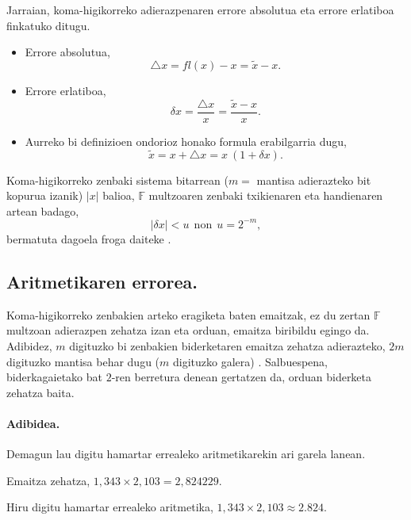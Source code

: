 Jarraian, koma-higikorreko adierazpenaren errore absolutua eta errore erlatiboa finkatuko ditugu.
\begin{itemize}
\item Errore absolutua,
\begin{equation*}
\triangle x= fl(x)-x= \tilde{x}-x. 
\end{equation*} 
\item Errore erlatiboa, 
\begin{equation*}
\delta x =\frac{\triangle x}{x} = \frac{\tilde{x}-x}{x}. 
\end{equation*}
\item Aurreko bi definizioen ondorioz honako formula erabilgarria dugu,
\begin{equation*}
\tilde{x}= x+\triangle x = x \ (1+\delta x).
\end{equation*}
\end{itemize}

Koma-higikorreko zenbaki sistema bitarrean ($m=$ mantisa adierazteko bit kopurua izanik) $|x|$ balioa, $\mathbb{F}$ multzoaren zenbaki txikienaren eta handienaren artean badago,
\begin{equation*}
 |\delta x|< u \ \ \text{non} \ \ u=2^{-m},
 \end{equation*}
bermatuta dagoela froga daiteke \cite{Corless2013}.

\subsection*{Aritmetikaren errorea.} 

Koma-higikorreko zenbakien arteko eragiketa baten emaitzak, ez du zertan $\mathbb{F}$ multzoan adierazpen zehatza izan  eta orduan, emaitza biribildu egingo  da. Adibidez, $m$ digituzko bi zenbakien biderketaren emaitza zehatza adierazteko, $2m$ digituzko mantisa behar dugu ($m$ digituzko galera) \cite{Fukushima2001}. Salbuespena, biderkagaietako bat $2$-ren berretura denean gertatzen da, orduan biderketa zehatza baita.

\paragraph*{Adibidea.} Demagun lau digitu hamartar errealeko aritmetikarekin ari garela lanean.

Emaitza zehatza, $1,343 \times 2,103 = 2,824229$. 

Hiru digitu hamartar errealeko aritmetika, $1,343 \times 2,103 \approx 2.824$.

